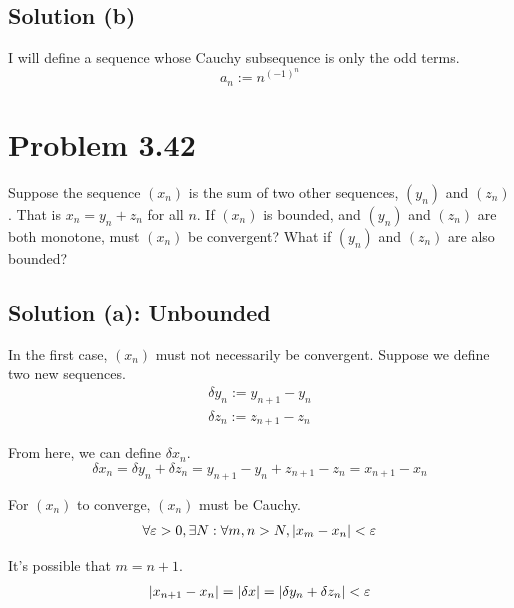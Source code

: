 \documentclass[12pt]{report}
\begin{document}
    \subsection{Solution (b)}
        I will define a sequence whose Cauchy subsequence is only the odd terms.
        \begin{equation}
            a_n := n^{(-1)^n}
        \end{equation}
\pagebreak

\section{Problem 3.42}
    Suppose the sequence $(x_n)$ is the sum of two other sequences, $(y_n)$ and $(z_n)$.
    That is $x_n = y_n + z_n$ for all $n$.
    If $(x_n)$ is bounded, and $(y_n)$ and $(z_n)$ are both monotone, must $(x_n)$ be convergent?
    What if $(y_n)$ and $(z_n)$ are also bounded?

    \subsection{Solution (a): Unbounded}
        In the first case, $(x_n)$ must not necessarily be convergent.
        Suppose we define two new sequences.
        \begin{gather}
            \delta y_n := y_{n + 1} - y_{n}\\
            \delta z_n := z_{n + 1} - z_{n}
        \end{gather}

        From here, we can define $\delta x_n$.
        \begin{equation}
            \delta x_n = \delta y_n + \delta z_n
                =   y_{n + 1} - y_{n} + z_{n + 1} - z_{n}
                =   x_{n + 1} - x_n
        \end{equation}

        For $(x_n)$ to converge, $(x_n)$ must be Cauchy.
        \begin{gather}
            \forall \varepsilon > 0, \exists N : \forall m, n > N, \left| x_m - x_n \right| < \varepsilon
        \end{gather}

        It's possible that $m = n + 1$.
        \begin{gather}
            \left| x_{n + 1} - x_n \right| = \left| \delta x \right| 
                =   \left| \delta y_n + \delta z_n \right|
                <   \varepsilon
        \end{gather}
\end{document}
